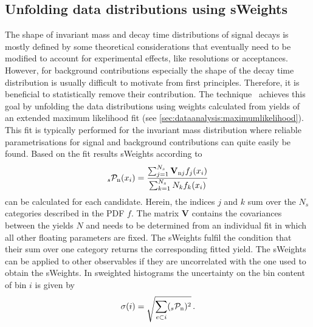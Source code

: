 
\subsection{Unfolding data distributions using sWeights}
\label{sec:dataanalysis:selection:splot}

The shape of invariant mass and decay time distributions of signal decays is
mostly defined by some theoretical considerations that eventually need to be
modified to account for experimental effects, like resolutions or acceptances.
However, for background contributions especially the shape of the decay time
distribution is usually difficult to motivate from first principles.
Therefore, it is beneficial to statistically remove their contribution. The
\sPlot technique~\cite{Pivk:2004ty} achieves this goal by unfolding the data
distributions using weights calculated from yields of an extended maximum
likelihood fit (see \cref{sec:dataanalysis:maximumlikelihood}). This fit is
typically performed for the invariant mass distribution where reliable
parametrisations for signal and background contributions can quite easily be
found. Based on the fit results sWeights according to
\begin{align}
	_{s}\mathcal{P}_\text{n}(x_i) = \frac{\sum_{j = 1}^{N_s}\textbf{V}_{\text{n}j}f_j(x_i)}{\sum_{k = 1}^{N_s} N_k f_k(x_i)}
\label{eq:dataanalysis:selection:splot:weightdefinition}
\end{align}
can be calculated for each candidate. Herein, the indices $j$ and $k$ sum over
the $N_s$ categories described in the PDF $f$. The matrix \textbf{V} contains
the covariances between the yields $N$ and needs to be determined from an
individual fit in which all other floating parameters are fixed. The sWeights
fulfil the condition that their sum over one category returns the
corresponding fitted yield. The sWeights can be applied to other observables
if they are uncorrelated with the one used to obtain the sWeights. In
sweighted histograms the uncertainty on the bin content of bin $i$ is given by
\begin{align}
	\sigma(i) = \sqrt{\sum_{e \subset i} (_{s}\mathcal{P}_\text{n})^2}\,.
\label{eq:dataanalysis:selection:splot:weighterror}
\end{align}